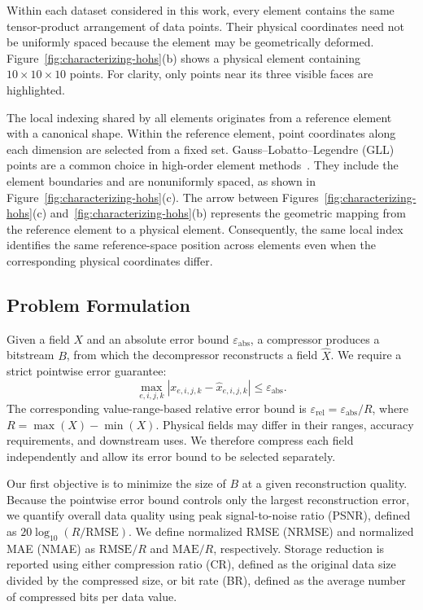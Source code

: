 Within each dataset considered in this work, every element contains the same tensor-product arrangement of data points. Their physical coordinates need not be uniformly spaced because the element may be geometrically deformed. Figure~\ref{fig:characterizing-hohs}(b) shows a physical element containing $10\times10\times10$ points. For clarity, only points near its three visible faces are highlighted.

The local indexing shared by all elements originates from a reference element with a canonical shape. Within the reference element, point coordinates along each dimension are selected from a fixed set. Gauss--Lobatto--Legendre (GLL) points are a common choice in high-order element methods~\cite{fischer2022nekrs,marin2016spectral}. They include the element boundaries and are nonuniformly spaced, as shown in Figure~\ref{fig:characterizing-hohs}(c). The arrow between Figures~\ref{fig:characterizing-hohs}(c) and~\ref{fig:characterizing-hohs}(b) represents the geometric mapping from the reference element to a physical element. Consequently, the same local index identifies the same reference-space position across elements even when the corresponding physical coordinates differ.

\subsection{Problem Formulation}\label{sec:problem formulation:metrics}

Given a field $X$ and an absolute error bound $\varepsilon_{\mathrm{abs}}$, a compressor produces a bitstream $B$, from which the decompressor reconstructs a field $\widehat{X}$. We require a strict pointwise error guarantee:
\begin{equation}
\max_{e,i,j,k}|x_{e,i,j,k}-\widehat{x}_{e,i,j,k}|\leq\varepsilon_{\mathrm{abs}}.
\end{equation}
The corresponding value-range-based relative error bound is $\varepsilon_{\mathrm{rel}}=\varepsilon_{\mathrm{abs}}/R$, where $R=\max(X)-\min(X)$. Physical fields may differ in their ranges, accuracy requirements, and downstream uses. We therefore compress each field independently and allow its error bound to be selected separately.

Our first objective is to minimize the size of $B$ at a given reconstruction quality. Because the pointwise error bound controls only the largest reconstruction error, we quantify overall data quality using peak signal-to-noise ratio (PSNR), defined as $20\log_{10}(R/\mathrm{RMSE})$. We define normalized RMSE (NRMSE) and normalized MAE (NMAE) as $\mathrm{RMSE}/R$ and $\mathrm{MAE}/R$, respectively. Storage reduction is reported using either compression ratio (CR), defined as the original data size divided by the compressed size, or bit rate (BR), defined as the average number of compressed bits per data value.

